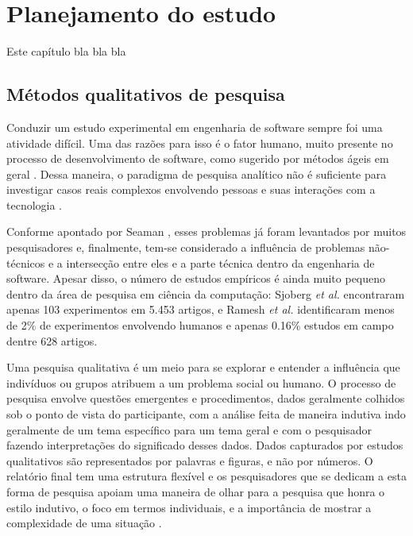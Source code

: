 \chapter{Planejamento do estudo} 
\label{cap:qualitativo-planejamento}

Este capítulo bla bla bla

\section{Métodos qualitativos de pesquisa}

Conduzir um estudo experimental em engenharia de software sempre foi uma
atividade difícil. Uma das razões para isso é o fator humano, muito presente 
no processo de desenvolvimento de software, como sugerido por métodos ágeis  em
geral \cite{AgileManifesto}. Dessa maneira, o paradigma de pesquisa analítico 
não é suficiente para investigar casos reais complexos envolvendo pessoas e 
suas interações com a tecnologia \cite{guidelines-case-study}.

Conforme apontado por Seaman \cite{seaman}, esses problemas já foram levantados
por muitos pesquisadores e, finalmente, tem-se considerado a influência de
problemas não-técnicos e a intersecção entre eles e a parte técnica
dentro da engenharia de software. 
Apesar disso, o número de estudos empíricos é ainda muito pequeno dentro da área
de pesquisa em ciência da computação: Sjoberg \textit{et al.} \cite{sjoberg} encontraram
apenas 103 experimentos em 5.453 artigos, e Ramesh \textit{et al.} \cite{ramesh}
identificaram menos de 2\% de experimentos envolvendo humanos e apenas 0.16\% 
estudos em campo dentre 628 artigos.

Uma pesquisa qualitativa é um meio para se explorar e entender a influência que 
indivíduos ou grupos atribuem a um problema social ou humano. O processo de
pesquisa envolve questões emergentes e procedimentos, dados geralmente colhidos
sob o ponto de vista do participante, com a análise feita de maneira indutiva
indo geralmente de um tema específico para um tema geral e com o pesquisador
fazendo interpretações do significado desses dados. Dados capturados por estudos
qualitativos são representados por palavras e figuras, e não por números.
O relatório final tem uma estrutura flexível e os pesquisadores que se
dedicam a esta forma de pesquisa apoiam uma maneira de olhar para a pesquisa que
honra o estilo indutivo, o foco em termos individuais, e a importância de mostrar a 
complexidade de uma situação \cite{creswell}. 

